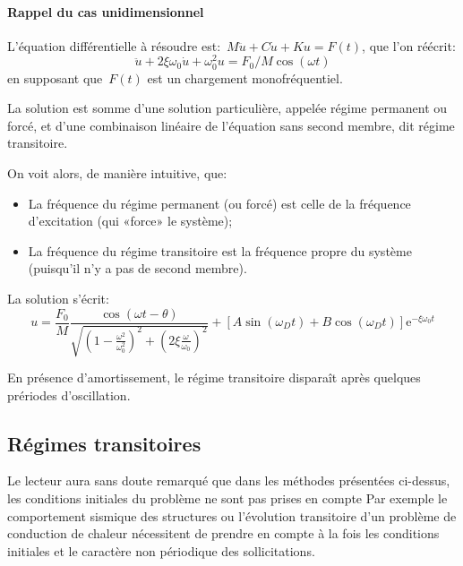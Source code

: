 \medskip
{}
\paragraph{Rappel du cas unidimensionnel}
L'équation différentielle à résoudre est:~$M\ddot{u}+C\dot{u}+Ku=F(t)$, que l'on
réécrit: \begin{equation} \ddot{u}+2\xi\omega_0\dot{u}+\omega^2_0 u=F_0/M \cos(\omega t)\end{equation}
en supposant que~$F(t)$ est un chargement monofréquentiel.

La solution est somme d'une solution particulière, appelée régime permanent ou forcé, et d'une
combinaison linéaire de l'équation sans second membre, dit régime transitoire.

On voit alors, de manière intuitive, que:
\begin{itemize}%
  \item La fréquence du régime permanent (ou forcé) est celle de la fréquence d'excitation (qui «force» le système);
  \item La fréquence du régime transitoire est la fréquence propre du système (puisqu'il n'y a pas de second membre).
\end{itemize}
La solution s'écrit:
\begin{equation}
u = \dfrac{F_0}M\dfrac{\cos(\omega t-\theta)}{\sqrt{\left(1-\frac{\omega^2}{\omega_0^2}\right)^2+\left(2\xi\frac{\omega}{\omega_0}\right)^2}}
+\left[A\sin (\omega_D t)+B\cos(\omega_D t)\right] \mathrm{e}^{-\xi\omega_0 t}
\end{equation}

\medskip
En présence d'amortissement, le régime transitoire disparaît après quelques prériodes d'oscillation.






\medskip{}
\subsection{Régimes transitoires}\label{Sec-RT}

Le lecteur aura sans doute remarqué que dans les méthodes présentées ci-dessus, les conditions initiales du problème ne sont pas prises en compte Par exemple le comportement sismique des structures ou l'évolution transitoire d'un problème de conduction de chaleur nécessitent de prendre en compte à la fois les conditions initiales et le caractère non périodique des sollicitations.

